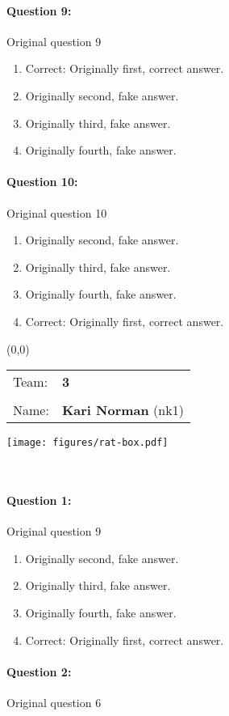 \documentclass[9pt, twoside, twocolumn]{extarticle}
\renewcommand{\includegraphics}[2][]{\OldIncludegraphics[width=\linewidth, #1]{#2}}
\newcommand{\individualprefix}[3]{%
\begin{textblock}{3.5}(0,0)
\fontfamily{phv}\selectfont
\begin{tabular}{ll}
Team: & \Large\linespread{6} \textbf{#3}\\
      & \\
Name: & \Large\linespread{6} \textbf{#1} (#2)
\end{tabular}

\texttt{[image: figures/rat-box.pdf]}
\end{textblock}
\textcolor{white}{.}\\ %
\vspace{6cm}
}%
\begin{document}
\paragraph{Question 9:}
Original question 9

\begin{enumerate}[label=\textbf{{\Alph*}},labelindent=0pt, labelsep=1.5em, parsep=0.2em]
\item Correct: Originally first, correct answer.
\item Originally second, fake answer.
\item Originally third, fake answer.
\item Originally fourth, fake answer.
\end{enumerate}
\paragraph{Question 10:}
Original question 10

\begin{enumerate}[label=\textbf{{\Alph*}},labelindent=0pt, labelsep=1.5em, parsep=0.2em]
\item Originally second, fake answer.
\item Originally third, fake answer.
\item Originally fourth, fake answer.
\item Correct: Originally first, correct answer.
\end{enumerate}
\cleardoublepage
\newpage

\individualprefix{Kari Norman}{nk1}{3}

\paragraph{Question 1:}
Original question 9

\begin{enumerate}[label=\textbf{{\Alph*}},labelindent=0pt, labelsep=1.5em, parsep=0.2em]
\item Originally second, fake answer.
\item Originally third, fake answer.
\item Originally fourth, fake answer.
\item Correct: Originally first, correct answer.
\end{enumerate}
\paragraph{Question 2:}
Original question 6
\end{document}
